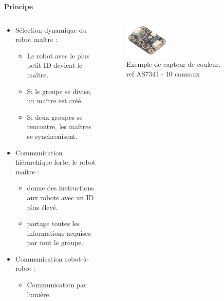 \documentclass[aspectratio=169,10pt]{beamer}
\begin{document}
\begin{frame}{\textbf{Principe}}
	\begin{columns}
		\begin{column}{0.5\textwidth}
			\begin{itemize}
				\item Sélection dynamique du robot maître :
				\begin{itemize}
					\item Le robot avec le plus petit ID devient le maître.
					\item Si le groupe se divise, un maître est créé.
					\item Si deux groupes se rencontre, les maîtres se synchronisent.
				\end{itemize}
				\item Communication hiérarchique forte, le robot maître :
				\begin{itemize}
					\item donne des instructions aux robots avec un ID plus élevé.
					\item partage toutes les informations acquises par tout le groupe.
				\end{itemize}
				\item Communication robot-à-robot :
				\begin{itemize}
					\item Communication par lumière.
				\end{itemize}
			\end{itemize}
		\end{column}
		\begin{column}{0.5\textwidth}
			\begin{figure}
				\centering
				\includegraphics[width=0.4\textwidth]{IMAGES/color_sensor.png}
				\caption{Exemple de capteur de couleur, ref AS7341 - 10 cannaux}
				\label{fig:color_sensor}
			\end{figure}
		\end{column}
	\end{columns}
\end{frame}
\end{document}
